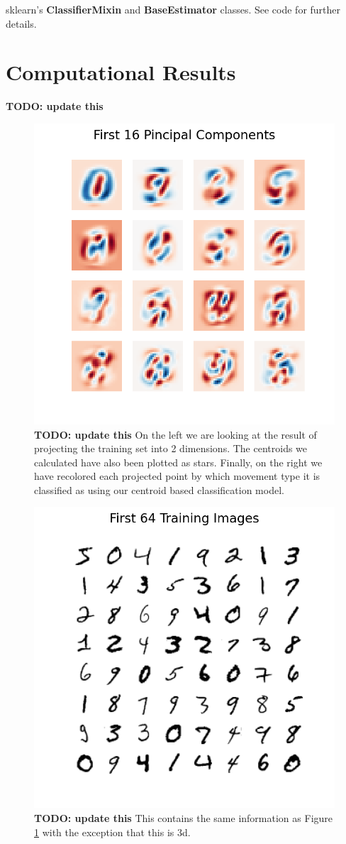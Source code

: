 \documentclass[11pt]{amsart}
\begin{document}
 sklearn's \textbf{ClassifierMixin} and \textbf{BaseEstimator} classes.
See code for further details.

\section{Computational Results}\label{sec:results} \textbf{TODO: update this}

\begin{figure}[h]
	\centering
	\includegraphics[width=.75\textwidth]{../visualizations/first_16_pincipal_components.png}
 	\caption{ \textbf{TODO: update this} On the left we are looking at the result of projecting the training set into 2 dimensions.
	The centroids we calculated have also been plotted as stars.
	Finally, on the right we have recolored each projected point by which movement type it is classified as using our centroid based classification model.}\label{fig:f2}
\end{figure}

\begin{figure}[h]
	\centering
	\includegraphics[width=.75\textwidth]{../visualizations/first_64_training_images.png}
 	\caption{ \textbf{TODO: update this} This contains the same information as Figure \ref{fig:f2} with the exception that this is 3d.}\label{fig:f3}
\end{figure}
\end{document}
